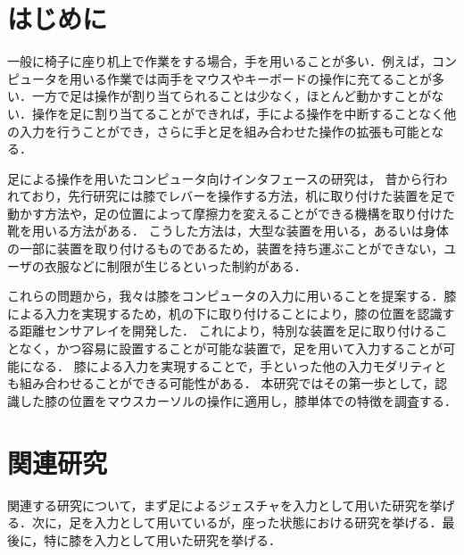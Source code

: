 \documentclass[submit, techrep]{ipsj}
\begin{document}
\section{はじめに}
一般に椅子に座り机上で作業をする場合，手を用いることが多い．例えば，コンピュータを用いる作業では両手をマウスやキーボードの操作に充てることが多い．一方で足は操作が割り当てられることは少なく，ほとんど動かすことがない．操作を足に割り当てることができれば，手による操作を中断することなく他の入力を行うことができ，さらに手と足を組み合わせた操作の拡張も可能となる．\par
足による操作を用いたコンピュータ向けインタフェースの研究は，
昔から行われており，先行研究には膝でレバーを操作する方法\cite{1698228}，机に取り付けた装置を足で動かす方法\cite{Pearson:1986:MMD:22627.22392, Pearson:1988:EEP:57167.57169}や，足の位置によって摩擦力を変えることができる機構を取り付けた靴\cite{Horodniczy:2017:FHE:3025453.3025625}を用いる方法がある．
こうした方法は，大型な装置を用いる，あるいは身体の一部に装置を取り付けるものであるため，装置を持ち運ぶことができない，ユーザの衣服などに制限が生じるといった制約がある．\par
これらの問題から，我々は膝をコンピュータの入力に用いることを提案する．膝による入力を実現するため，机の下に取り付けることにより，膝の位置を認識する距離センサアレイを開発した．
これにより，特別な装置を足に取り付けることなく，かつ容易に設置することが可能な装置で，足を用いて入力することが可能になる．
膝による入力を実現することで，手といった他の入力モダリティとも組み合わせることができる可能性がある．
本研究ではその第一歩として，認識した膝の位置をマウスカーソルの操作に適用し，膝単体での特徴を調査する．



\section{関連研究}
関連する研究について，まず足によるジェスチャを入力として用いた研究を挙げる．次に，足を入力として用いているが，座った状態における研究を挙げる．最後に，特に膝を入力として用いた研究を挙げる．
\end{document}
